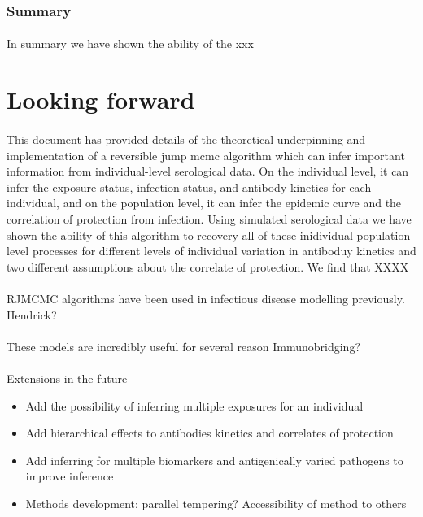 \documentclass{article}
\begin{document}
\subsubsection{Summary}
\paragraph{}In summary we have shown the ability of the xxx





\newpage
\section{Looking forward}
\paragraph{}This document has provided details of the theoretical underpinning and implementation of a reversible jump mcmc algorithm which can infer important information from individual-level serological data. On the individual level, it can infer the exposure status, infection status, and antibody kinetics for each individual, and on the population level, it can infer the epidemic curve and the correlation of protection from infection. Using simulated serological data we have shown the ability of this algorithm to recovery all of these inidividual population level processes for different levels of individual variation in antiboduy kinetics and two different assumptions about the correlate of protection. We find that XXXX

\paragraph{}RJMCMC algorithms have been used in infectious disease modelling previously. Hendrick? 

\paragraph{}These models are incredibly useful for several reason Immunobridging?

\paragraph{}Extensions in the future
\begin{itemize}
\item Add the possibility of inferring multiple exposures for an individual
\item Add hierarchical effects to antibodies kinetics and correlates of protection
\item Add inferring for multiple biomarkers and antigenically varied pathogens to improve inference
\item Methods development: parallel tempering? Accessibility of method to others 
\end{itemize}
\end{document}
